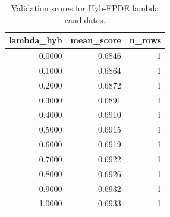 \begin{table}[t]
\caption{Validation scores for Hyb-FPDE lambda candidates.}
\label{tab:lambda_distribution_computed}
\centering
\begin{tabular}{rrr}
\toprule
lambda\_hyb & mean\_score & n\_rows \\
\midrule
0.0000 & 0.6846 & 1 \\
0.1000 & 0.6864 & 1 \\
0.2000 & 0.6872 & 1 \\
0.3000 & 0.6891 & 1 \\
0.4000 & 0.6910 & 1 \\
0.5000 & 0.6915 & 1 \\
0.6000 & 0.6919 & 1 \\
0.7000 & 0.6922 & 1 \\
0.8000 & 0.6926 & 1 \\
0.9000 & 0.6932 & 1 \\
1.0000 & 0.6933 & 1 \\
\bottomrule
\end{tabular}

\end{table}
